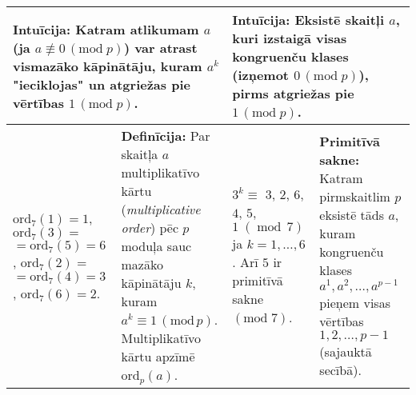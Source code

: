 \documentclass[a4paper]{article}
\begin{document}
\begin{table}[ht!]
{\begin{tabular*}{18.46cm}{@{}|p{2cm}p{6.35cm}|p{2cm}p{6.35cm}|@{}}
\multicolumn{2}{|p{8.787cm}|}{
\cellcolor[HTML]{DAF0FF}
{\bf Intuīcija:}
Katram atlikumam $a$ (ja $a \not\equiv 0\,(\text{mod}\;p)$) var atrast vismazāko kāpinātāju, 
kuram $a^k$ "ieciklojas" un atgriežas pie vērtības $1\,(\text{mod}\;p)$.
}
& 
\multicolumn{2}{p{8.787cm}|}{
\cellcolor[HTML]{DAF0FF}
{\bf Intuīcija:}
Eksistē skaitļi $a$, kuri izstaigā visas kongruenču klases (izņemot $0\,(\text{mod}\;p)$), pirms atgriežas pie $1\,(\text{mod}\;p)$.
} \\ \hline

$\text{ord}_7(1) = 1$,\newline
$\text{ord}_7(3) =$ \newline $= \text{ord}_7(5) = 6$,\newline
$\text{ord}_7(2) =$ \newline $= \text{ord}_7(4) = 3$,\newline
$\text{ord}_7(6) = 2$.
& \cellcolor[HTML]{E1FFE1}
{\bf Definīcija:} Par skaitļa $a$ multiplikatīvo kārtu ({\em multiplicative order}) 
pēc $p$ moduļa sauc mazāko kāpinātāju $k$, kuram $a^k \equiv 1\,(\text{mod}\,p)$.\newline
Multiplikatīvo kārtu apzīmē $\text{ord}_p(a)$.
& $3^k \equiv$ $3$, $2$, $6$, $4$, $5$, $1\;(\operatorname{mod}\,7)$ ja $k=1,\ldots,6$. \newline 
Arī $5$ ir pri\-mi\-tī\-vā sakne $(\mbox{mod}\;7)$.
& \cellcolor[HTML]{E1FFE1}
{\bf Primitīvā sakne:} Katram pirmskaitlim $p$ eksistē tāds 
$a$, kuram kongruenču klases $a^1,a^2,\ldots,a^{p-1}$ pieņem visas
vērtības $1,2,\ldots,p-1$  (sajauktā secībā). \\ \hline

\end{tabular*}
}
\end{table}






\end{document}
